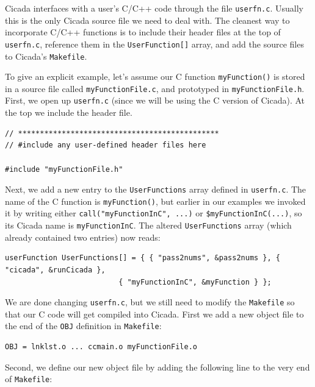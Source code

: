 \documentclass{article}
\newenvironment{code}{
       \begin{list}{}{
               \setlength{\leftmargin}{.4in}
               \setlength{\rightmargin}{0in}
               \setlength{\topsep}{.2in}
       }
       \small
       \item[] }
       { \end{list}   }
\begin{document}
Cicada interfaces with a user's C/C++ code through the file \verb#userfn.c#.  Usually this is the only Cicada source file we need to deal with.  The cleanest way to incorporate C/C++ functions is to include their header files at the top of \verb#userfn.c#, reference them in the \verb#UserFunction[]# array, and add the source files to Cicada's \verb#Makefile#.

To give an explicit example, let's assume our C function \verb#myFunction()# is stored in a source file called \verb#myFunctionFile.c#, and prototyped in \verb#myFunctionFile.h#.  First, we open up \verb#userfn.c# (since we will be using the C version of Cicada).  At the top we include the header file.

\begin{code} \begin{verbatim}
// **********************************************
// #include any user-defined header files here

#include "myFunctionFile.h"
\end{verbatim} \end{code}

Next, we add a new entry to the \verb#UserFunctions# array defined in \verb#userfn.c#.  The name of the C function is \verb#myFunction()#, but earlier in our examples we invoked it by writing either \verb#call("myFunctionInC", ...)# or \verb#$myFunctionInC(...)#, so its Cicada name is \verb#myFunctionInC#.  The altered \verb#UserFunctions# array (which already contained two entries) now reads:

\begin{code} \begin{verbatim}
userFunction UserFunctions[] = { { "pass2nums", &pass2nums }, { "cicada", &runCicada },
                          { "myFunctionInC", &myFunction } };
\end{verbatim} \end{code}

We are done changing \verb#userfn.c#, but we still need to modify the \verb#Makefile# so that our C code will get compiled into Cicada.  First we add a new object file to the end of the \verb#OBJ# definition in \verb#Makefile#:

\begin{code} \begin{verbatim}
OBJ = lnklst.o ... ccmain.o myFunctionFile.o
\end{verbatim} \end{code}

\noindent Second, we define our new object file by adding the following line to the very end of \verb#Makefile#:
\end{document}
